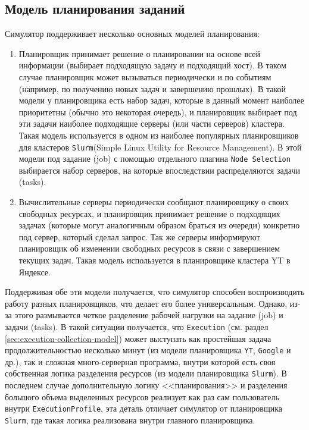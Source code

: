 \subsection{Модель планирования заданий}

Симулятор поддерживает несколько основных моделей планирования: 
\begin{enumerate}
    \item Планировщик принимает решение о планировании на основе всей информации (выбирает подходящую задачу и подходящий хост). В таком случае планировщик может вызываться периодически и по событиям (например, по получению новых задач и завершению прошлых). В такой модели у планировщика есть набор задач, которые в данный момент наиболее приоритетны (обычно это некоторая очередь), и планировщик выбирает под эти задачи наиболее подходящие серверы (или части серверов) кластера. Такая модель используется в одном из наиболее популярных планировщиков для кластеров \texttt{Slurm}\cite{slurm-cpu-management}(Simple Linux Utility for Resource Management). В этой модели под задание (job) с помощью отдельного плагина \texttt{Node Selection} выбирается набор серверов, на которые впоследствии распределяются задачи (tasks). 
    \item Вычислительные серверы периодически сообщают планировщику о своих свободных ресурсах, и планировщик принимает решение о подходящих задачах (которые могут аналогичным образом браться из очереди) конкретно под сервер, который сделал запрос. Так же серверы информируют планировщик об изменении свободных ресурсов в связи с завершением текущих задач. Такая модель используется в планировщике кластера YT в Яндексе\cite{yt-scheduler}.
\end{enumerate}

Поддерживая обе эти модели получается, что симулятор способен воспроизводить работу разных планировщиков, что делает его более универсальным. Однако, из-за этого размывается четкое разделение рабочей нагрузки на задание (job) и задачи (tasks). В такой ситуации получается, что \texttt{Execution} (см. раздел \ref{sec:execution-collection-model}) может выступать как простейшая задача продолжительностью несколько минут (из модели планировщика \texttt{YT}, \texttt{Google} и др.), так и сложная много-серверная программа, внутри которой есть своя собственная логика разделения ресурсов (из модели планировщика \texttt{Slurm}). В последнем случае дополнительную логику <<планирования>> и разделения большого объема выделенных ресурсов реализует как раз сам пользователь внутри \texttt{ExecutionProfile}, эта деталь отличает симулятор от планировщика \texttt{Slurm}, где такая логика реализована внутри главного планировщика.


